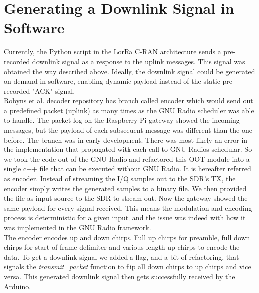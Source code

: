 \section{Generating a Downlink Signal in Software}
Currently, the Python script in the LorRa C-RAN architecture sends a pre-recorded downlink signal as a response to the uplink messages.
This signal was obtained the way described above. Ideally, the downlink signal could be generated on demand in software, enabling dynamic 
payload instead of the static pre recorded "ACK" signal.\\
Robyns et al. decoder repository has branch called encoder which would send out a predefined packet (uplink) as many times as the GNU Radio scheduler 
was able to handle. The packet log on the Raspberry Pi gateway showed the incoming messages, but the payload of each subsequent message was different 
than the one before. The branch was in early development. There was most likely an error in the implementation that propagated with each call to GNU Radios schedular.
So we took the code out of the GNU Radio and refactored this OOT module into a single c++ file that can be executed without GNU Radio. It is hereafter referred as encoder.
Instead of streaming the I/Q samples out to the SDR's TX, the encoder simply writes the generated samples to a binary file.
We then provided the file as input source to the SDR to stream out. Now the gateway showed the same payload for every signal received. 
This means the modulation and encoding process is deterministic for a given input, and the issue was indeed with how it was implemented in the GNU Radio framework.
\\
The encoder encodes up and down chirps. Full up chirps for preamble, full down chirps for start of frame delimiter and various length up chirps to encode the data.
To get a downlink signal we added a flag, and a bit of refactoring, that signals the \emph{transmit\_packet} function to flip all down chirps to up chirps and vice versa.
This generated downlink signal then gets successfully received by the Arduino. 

